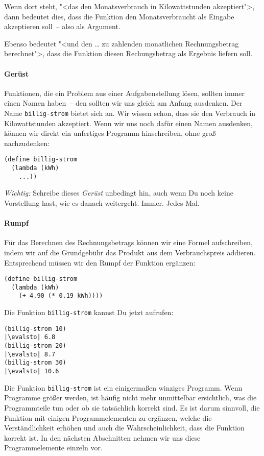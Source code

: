 Wenn dort steht, "<das den Monatsverbrauch in Kilowattstunden
akzeptiert">, dann bedeutet dies, dass die Funktion den
Monatsverbraucht als Eingabe akzeptieren soll~-- also als Argument.

Ebenso bedeutet "<und den \ldots{} zu zahlenden monatlichen
Rechnungsbetrag berechnet">, dass die Funktion diesen Rechungsbetrag
als Ergebnis liefern soll.

\paragraph{Gerüst}

Funktionen, die ein Problem aus einer Aufgabenstellung lösen, sollten
immer einen Namen haben~-- den sollten wir uns gleich am Anfang
ausdenken.  Der Name \lstinline{billig-strom} bietet sich an.  Wir wissen
schon, dass sie den Verbrauch in Kilowattstunden akzeptiert.  Wenn wir
uns noch dafür einen Namen ausdenken, können wir direkt ein unfertiges
Programm hinschreiben, ohne groß nachzudenken:
%
\begin{lstlisting}
(define billig-strom
  (lambda (kWh)
    ...))
\end{lstlisting}
%
\emph{Wichtig:} Schreibe dieses \textit{Gerüst}
unbedingt hin, auch wenn Du noch keine Vorstellung hast, wie es danach
weitergeht.  Immer.  Jedes Mal.

\paragraph{Rumpf}

Für das Berechnen des Rechnungsbetrags können wir eine Formel
aufschreiben, indem wir auf die Grundgebühr das Produkt aus dem
Verbrauchspreis addieren.  Entsprechend müssen wir den Rumpf der
Funktion ergänzen:
%
\begin{lstlisting}
(define billig-strom
  (lambda (kWh)
    (+ 4.90 (* 0.19 kWh))))
\end{lstlisting}
%
Die Funktion \lstinline{billig-strom} kannst Du jetzt aufrufen:
%
\begin{lstlisting}
(billig-strom 10)
|\evalsto| 6.8
(billig-strom 20)
|\evalsto| 8.7
(billig-strom 30)
|\evalsto| 10.6
\end{lstlisting}
%
Die Funktion \lstinline{billig-strom} ist ein einigermaßen winziges
Programm.  Wenn Programme größer werden, ist häufig nicht mehr
unmittelbar ersichtlich, was die Programmteile tun oder ob sie
tatsächlich korrekt sind.  Es ist darum sinnvoll, die Funktion mit
einigen Programmelementen zu ergänzen, welche die Verständlichkeit
erhöhen und auch die Wahrscheinlichkeit, dass die Funktion korrekt
ist.  In den nächsten Abschnitten nehmen wir uns diese
Programmelemente einzeln vor.

